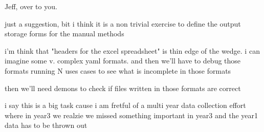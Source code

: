 Jeff, over to you.

just a suggestion, bit i think it is a non trivial exercise to define the output storage forms for the manual methods

i'm think that "headers for the excel spreadsheet" is thin edge of the wedge. i can imagine some v. complex yaml formats. and then we'll have to debug those formats running N uses cases to see what is incomplete in those formats

then we'll need demons to check if files written in those formats are correct

i say this is a big task cause i am fretful of a multi year data collection effort where in year3 we realzie we missed something important in year3 and the year1 data has to be thrown out